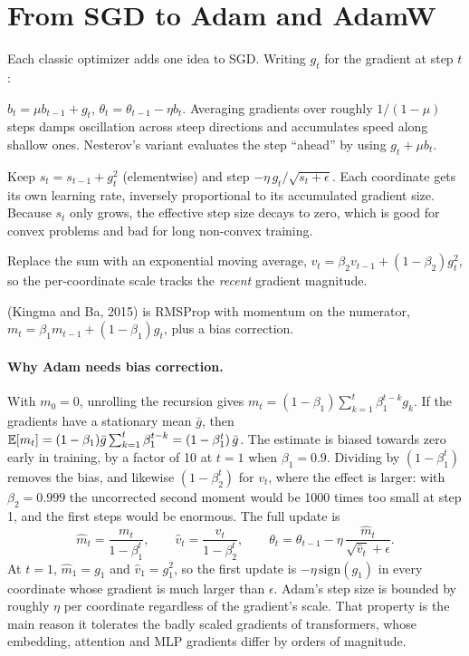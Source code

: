 \section{From SGD to Adam and AdamW}\label{sec:optim:adam}

Each classic optimizer adds one idea to SGD. Writing $g_t$ for the gradient at step $t$:

\begin{description}[leftmargin=1.2em, style=nextline]
  \item[Momentum.] $b_t = \mu b_{t-1} + g_t$, $\theta_t = \theta_{t-1} - \eta b_t$. Averaging
    gradients over roughly $1/(1-\mu)$ steps damps oscillation across steep directions and
    accumulates speed along shallow ones. Nesterov's variant evaluates the step ``ahead'' by using
    $g_t + \mu b_t$.
  \item[AdaGrad.] Keep $s_t = s_{t-1} + g_t^2$ (elementwise) and step
    $-\eta\, g_t/\sqrt{s_t+\epsilon}$. Each coordinate gets its own learning rate, inversely
    proportional to its accumulated gradient size. Because $s_t$ only grows, the effective step size
    decays to zero, which is good for convex problems and bad for long non-convex training.
  \item[RMSProp.] Replace the sum with an exponential moving average,
    $v_t = \beta_2 v_{t-1} + (1-\beta_2) g_t^2$, so the per-coordinate scale tracks the
    \emph{recent} gradient magnitude.
  \item[Adam] (Kingma and Ba, 2015) is RMSProp with momentum on the numerator,
    $m_t = \beta_1 m_{t-1} + (1-\beta_1) g_t$, plus a bias correction.
\end{description}

\paragraph{Why Adam needs bias correction.} With $m_0=0$, unrolling the recursion gives
$m_t = (1-\beta_1)\sum_{k=1}^{t}\beta_1^{t-k} g_k$. If the gradients have a stationary mean
$\bar g$, then $\mathbb{E}[m_t] = (1-\beta_1)\bar g \sum_{k=1}^{t}\beta_1^{t-k} = (1-\beta_1^t)\,\bar g$.
The estimate is biased towards zero early in training, by a factor of 10 at $t=1$ when
$\beta_1=0.9$. Dividing by $(1-\beta_1^t)$ removes the bias, and likewise $(1-\beta_2^t)$ for
$v_t$, where the effect is larger: with $\beta_2=0.999$ the uncorrected second moment would be
1000 times too small at step 1, and the first steps would be enormous. The full update is
\begin{equation}
\hat m_t = \frac{m_t}{1-\beta_1^t},\qquad \hat v_t = \frac{v_t}{1-\beta_2^t},\qquad
\theta_t = \theta_{t-1} - \eta\,\frac{\hat m_t}{\sqrt{\hat v_t}+\epsilon}.
\label{eq:optim:adam}
\end{equation}
At $t=1$, $\hat m_1 = g_1$ and $\hat v_1 = g_1^2$, so the first update is
$-\eta\,\mathrm{sign}(g_1)$ in every coordinate whose gradient is much larger than $\epsilon$.
Adam's step size is bounded by roughly $\eta$ per coordinate regardless of the gradient's scale.
That property is the main reason it tolerates the badly scaled gradients of transformers, whose
embedding, attention and MLP gradients differ by orders of magnitude.

